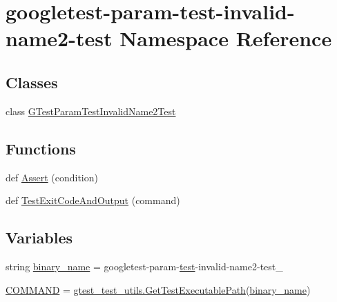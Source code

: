 \hypertarget{namespacegoogletest-param-test-invalid-name2-test}{}\section{googletest-\/param-\/test-\/invalid-\/name2-\/test Namespace Reference}
\label{namespacegoogletest-param-test-invalid-name2-test}
\subsection*{Classes}
\begin{DoxyCompactItemize}
\item 
class \mbox{\hyperlink{classgoogletest-param-test-invalid-name2-test_1_1_g_test_param_test_invalid_name2_test}{G\+Test\+Param\+Test\+Invalid\+Name2\+Test}}
\end{DoxyCompactItemize}
\subsection*{Functions}
\begin{DoxyCompactItemize}
\item 
def \mbox{\hyperlink{namespacegoogletest-param-test-invalid-name2-test_abce82484b5e340c0951436eab006fa2e}{Assert}} (condition)
\item 
def \mbox{\hyperlink{namespacegoogletest-param-test-invalid-name2-test_a6897220a9a1986dd4bbef1ca9f0629bd}{Test\+Exit\+Code\+And\+Output}} (command)
\end{DoxyCompactItemize}
\subsection*{Variables}
\begin{DoxyCompactItemize}
\item 
string \mbox{\hyperlink{namespacegoogletest-param-test-invalid-name2-test_a0e26891aaf72a6f04a60811b05a83e81}{binary\+\_\+name}} = \textquotesingle{}googletest-\/param-\/\mbox{\hyperlink{_mutual_8h_a707ee03719e99670bf6cfdfd897b8456}{test}}-\/invalid-\/name2-\/test\+\_\+\textquotesingle{}
\item 
\mbox{\hyperlink{namespacegoogletest-param-test-invalid-name2-test_ac9395338e8bff8c30835e578658394e3}{C\+O\+M\+M\+A\+ND}} = \mbox{\hyperlink{namespacegtest__test__utils_a89ed3717984a80ffbb7a9c92f71b86a2}{gtest\+\_\+test\+\_\+utils.\+Get\+Test\+Executable\+Path}}(\mbox{\hyperlink{namespacegoogletest-param-test-invalid-name2-test_a0e26891aaf72a6f04a60811b05a83e81}{binary\+\_\+name}})
\end{DoxyCompactItemize}


